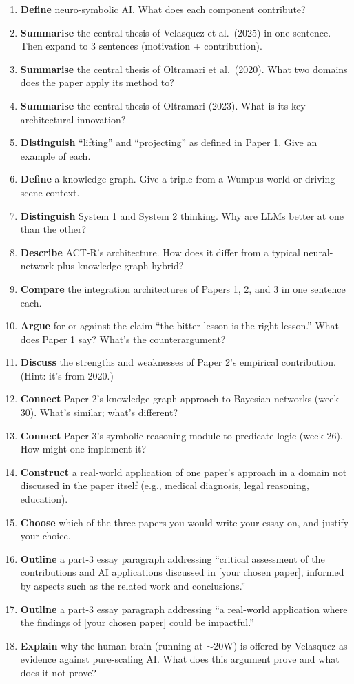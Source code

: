 \documentclass[11pt, a4paper]{article}
\begin{document}
\begin{enumerate}
  \item \textbf{Define} neuro-symbolic AI. What does each component contribute?
  \item \textbf{Summarise} the central thesis of Velasquez et al.\ (2025) in one sentence. Then expand to 3 sentences (motivation + contribution).
  \item \textbf{Summarise} the central thesis of Oltramari et al.\ (2020). What two domains does the paper apply its method to?
  \item \textbf{Summarise} the central thesis of Oltramari (2023). What is its key architectural innovation?
  \item \textbf{Distinguish} ``lifting'' and ``projecting'' as defined in Paper 1. Give an example of each.
  \item \textbf{Define} a knowledge graph. Give a triple from a Wumpus-world or driving-scene context.
  \item \textbf{Distinguish} System 1 and System 2 thinking. Why are LLMs better at one than the other?
  \item \textbf{Describe} ACT-R's architecture. How does it differ from a typical neural-network-plus-knowledge-graph hybrid?
  \item \textbf{Compare} the integration architectures of Papers 1, 2, and 3 in one sentence each.
  \item \textbf{Argue} for or against the claim ``the bitter lesson is the right lesson.'' What does Paper 1 say? What's the counterargument?
  \item \textbf{Discuss} the strengths and weaknesses of Paper 2's empirical contribution. (Hint: it's from 2020.)
  \item \textbf{Connect} Paper 2's knowledge-graph approach to Bayesian networks (week 30). What's similar; what's different?
  \item \textbf{Connect} Paper 3's symbolic reasoning module to predicate logic (week 26). How might one implement it?
  \item \textbf{Construct} a real-world application of one paper's approach in a domain not discussed in the paper itself (e.g., medical diagnosis, legal reasoning, education).
  \item \textbf{Choose} which of the three papers you would write your essay on, and justify your choice.
  \item \textbf{Outline} a part-3 essay paragraph addressing ``critical assessment of the contributions and AI applications discussed in [your chosen paper], informed by aspects such as the related work and conclusions.''
  \item \textbf{Outline} a part-3 essay paragraph addressing ``a real-world application where the findings of [your chosen paper] could be impactful.''
  \item \textbf{Explain} why the human brain (running at $\sim$20W) is offered by Velasquez as evidence against pure-scaling AI. What does this argument prove and what does it not prove?
\end{enumerate}
\end{document}
